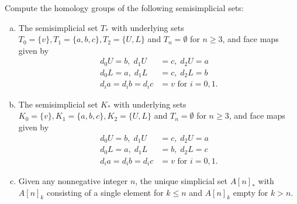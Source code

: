 \documentclass[11pt,letterpaper]{article}
\begin{document}
\begin{problem}
    Compute the homology groups of the following semisimplicial sets:
    \begin{enumerate}[(a)]
        \item The semisimplicial set $T_*$ with underlying sets $T_0 = \{v\}, T_1 = \{a, b, c\}, T_2 = \{U, L\}$ and $T_n = \emptyset$ for $n\geq 3$, and face maps given by 
        \[
            \begin{aligned}
                d_0U = b,\; d_1U &= c,\; d_2U = a\\
                d_0L = a,\; d_1L &= c,\; d_2L = b\\
                d_ia = d_ib = d_ic& = v\textrm{ for } i =0,1.
            \end{aligned}
        \] 
        \item The semisimplicial set $K_*$ with underlying sets $K_0 = \{v\}, K_1 = \{a, b, c\}, K_2 = \{U, L\}$ and $T_n = \emptyset$ for $n\geq 3$, and face maps given by 
        \[
            \begin{aligned}
                d_0U = b,\; d_1U &= c,\; d_2U = a\\
                d_0L = a,\; d_1L &= b,\; d_2L = c\\
                d_ia = d_ib = d_ic& = v\textrm{ for } i =0,1.
            \end{aligned}
        \] 
        \item Given any nonnegative integer $n$, the unique simplicial set $A[n]_*$ with $A[n]_k$ consisting of a single element for $k\leq n$ and $A[n]_k$ empty for $k > n$. 
    \end{enumerate}
\end{problem}
\end{document}

